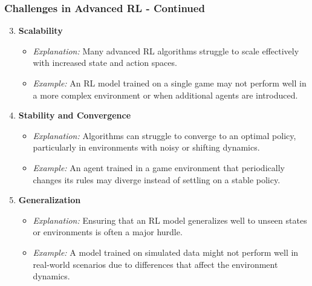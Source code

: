 \documentclass{beamer}
\begin{document}
\begin{frame}[fragile]
    \frametitle{Challenges in Advanced RL - Continued}
    \begin{enumerate}
        \setcounter{enumi}{2}
        \item \textbf{Scalability}
        \begin{itemize}
            \item \textit{Explanation:} Many advanced RL algorithms struggle to scale effectively with increased state and action spaces.
            \item \textit{Example:} An RL model trained on a single game may not perform well in a more complex environment or when additional agents are introduced.
        \end{itemize}

        \item \textbf{Stability and Convergence}
        \begin{itemize}
            \item \textit{Explanation:} Algorithms can struggle to converge to an optimal policy, particularly in environments with noisy or shifting dynamics.
            \item \textit{Example:} An agent trained in a game environment that periodically changes its rules may diverge instead of settling on a stable policy.
        \end{itemize}

        \item \textbf{Generalization}
        \begin{itemize}
            \item \textit{Explanation:} Ensuring that an RL model generalizes well to unseen states or environments is often a major hurdle.
            \item \textit{Example:} A model trained on simulated data might not perform well in real-world scenarios due to differences that affect the environment dynamics.
        \end{itemize}
    \end{enumerate}
\end{frame}
\end{document}
